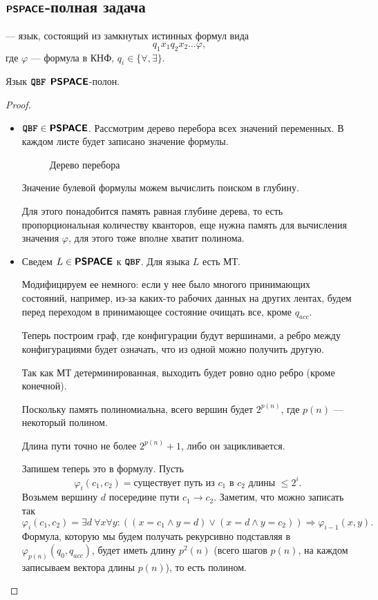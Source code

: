 \subsection{$ \textmd{\textbf{\textsf{PSPACE}}}$-полная задача}
\begin{defn}\index{\QBF}
	 --- язык, состоящий из замкнутых истинных формул вида \[
	q_1 x_1 q_2 x_2 \ldots \varphi 
	,\]    
	где $ \varphi $ --- формула в КНФ, $ q_i \in \{ \forall , \exists \}$.
\end{defn}
\begin{thm}
	Язык $ {{\textbf{\texttt{QBF}}}}$ $ \textmd{\textbf{\textsf{PSPACE}}} $-полон.
\end{thm}
\begin{proof}
	\begin{itemize}
		\item $ {{\textbf{\texttt{QBF}}}} \in \textmd{\textbf{\textsf{PSPACE}}}$. Рассмотрим дерево перебора всех значений переменных. В каждом листе будет записано значение формулы.
	\begin{figure}[ht]
		\centering
		\caption{Дерево перебора}
		\label{fig:qbf-tree}
	\end{figure}
	Значение булевой формулы можем вычислить поиском в глубину.
	
	Для этого понадобится память равная глубине дерева, то есть пропорциональная количеству кванторов, еще нужна память для вычисления значения $ \varphi $, для этого тоже вполне хватит полинома.
	
    \item Сведем $ L \in \textmd{\textbf{\textsf{PSPACE}}}$ к $ {{\textbf{\texttt{QBF}}}}$. Для языка  $ L$ есть МТ. 
    
    Модифицируем ее немного: если у нее было многого принимающих состояний, например, из-за каких-то рабочих данных на других лентах, будем перед переходом в принимающее состояние очищать все, кроме $ q_{acc}$.

	Теперь построим граф, где конфигурации будут вершинами, а ребро между конфигурациями будет означать, что из одной можно получить другую.

	 Так как МТ детерминированная, выходить будет ровно одно ребро (кроме конечной).

	 Поскольку память полиномиальна, всего вершин будет $ 2^{p(n)}$, где $ p(n)$ --- некоторый полином.

	 Длина пути точно не более $ 2^{p(n)}+1$, либо он зацикливается.

	 Запишем теперь это в формулу.
	 Пусть
	 \[
		 \varphi_i (c_1, c_2) = \text{существует путь из } c_1 \text{ в } c_2 \text{ длины } \le 2^{i}
	 .\] 
	 Возьмем вершину $ d$ посередине пути $ c_1 \to c_2$. Заметим, что можно записать так
	 \[
		 \varphi_i(c_1, c_2) = \exists d  ~\forall x \forall y \colon   \left( (x = c_1 \wedge  y = d) \vee (x = d \wedge  y = c_2) \right)  \Longrightarrow \varphi _{i-1}(x, y)
	 .\] 
	 Формула, которую мы будем получать рекурсивно подставляя в $ \varphi _{p(n)}(q_0, q_{acc})$, будет иметь длину $ p^2(n)$ (всего шагов $p(n)$, на каждом записываем вектора длины $p(n)$), то есть полином.


\end{itemize}
\end{proof}

